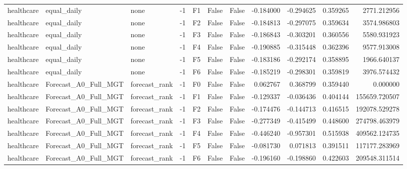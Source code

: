 \begin{tabular}{lllrlllrrrr}
healthcare &                  equal\_daily &          none &    -1 &  F1 &           False &            False & -0.184000 & -0.294625 & 0.359265 &      2771.212956 \\
healthcare &                  equal\_daily &          none &    -1 &  F2 &           False &            False & -0.184813 & -0.297075 & 0.359634 &      3574.986803 \\
healthcare &                  equal\_daily &          none &    -1 &  F3 &           False &            False & -0.186843 & -0.303201 & 0.360556 &      5580.931923 \\
healthcare &                  equal\_daily &          none &    -1 &  F4 &           False &            False & -0.190885 & -0.315448 & 0.362396 &      9577.913008 \\
healthcare &                  equal\_daily &          none &    -1 &  F5 &           False &            False & -0.183186 & -0.292174 & 0.358895 &      1966.640137 \\
healthcare &                  equal\_daily &          none &    -1 &  F6 &           False &            False & -0.185219 & -0.298301 & 0.359819 &      3976.574432 \\
healthcare &         Forecast\_A0\_Full\_MGT & forecast\_rank &    -1 &  F0 &           False &            False &  0.062767 &  0.368799 & 0.359440 &         0.000000 \\
healthcare &         Forecast\_A0\_Full\_MGT & forecast\_rank &    -1 &  F1 &           False &            False & -0.129337 & -0.036436 & 0.404144 &    155659.720507 \\
healthcare &         Forecast\_A0\_Full\_MGT & forecast\_rank &    -1 &  F2 &           False &            False & -0.174476 & -0.144713 & 0.416515 &    192078.529278 \\
healthcare &         Forecast\_A0\_Full\_MGT & forecast\_rank &    -1 &  F3 &           False &            False & -0.277349 & -0.415499 & 0.448600 &    274798.463979 \\
healthcare &         Forecast\_A0\_Full\_MGT & forecast\_rank &    -1 &  F4 &           False &            False & -0.446240 & -0.957301 & 0.515938 &    409562.124735 \\
healthcare &         Forecast\_A0\_Full\_MGT & forecast\_rank &    -1 &  F5 &           False &            False & -0.081730 &  0.071813 & 0.391511 &    117177.283969 \\
healthcare &         Forecast\_A0\_Full\_MGT & forecast\_rank &    -1 &  F6 &           False &            False & -0.196160 & -0.198860 & 0.422603 &    209548.311514 \\

\end{tabular}
